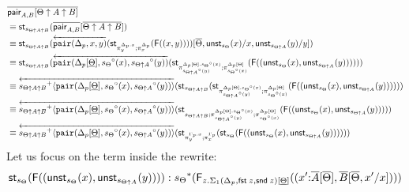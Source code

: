 \documentclass[10pt]{article}
\theoremstyle{definition}
\newcommand\dsd[1]{\ensuremath{\mathsf{#1}}}
\newcommand{\rewrite}[2]{\overleftarrow{#1}(#2)}
\newcommand\F[2]{\ensuremath{\mathsf{F}_{#1}(#2)}}
\newcommand\St[2]{\ensuremath{{#1}^*(#2)}}
\newcommand\StI[2]{\ensuremath{\mathsf{st}_{#1}(#2)}}
\newcommand\UnSt[2]{\ensuremath{\mathsf{unst}_{#1}(#2)}}
\newcommand\FI[1]{\ensuremath{\mathsf{F}{(#1)}}}
\newcommand\TrCirc[2]{\ensuremath{{#1}^\circ(#2)}}
\newcommand\ApPlus[2]{\ensuremath{{#1}^+ \langle #2 \rangle }}
\newcommand{\app}[2]{\ensuremath{#1 \: #2}}
\newcommand{\fst}[1]{\app{\dsd{fst}}{#1}}
\newcommand{\snd}[1]{\app{\dsd{snd}}{#1}}
\newcommand{\telety}[3]{\ensuremath{(#1{:}#2,#3)}}
\begin{document}
\begin{enumerate}[style = multiline, labelwidth = 80pt]
\begin{align*}
&\upstairs{\mathsf{pair}_{A, B}[\Theta \uparrow A \uparrow B]} \\
&\equiv \StI{s_{\Theta \uparrow A \uparrow B}}{\upstairs{\mathsf{pair}_{A, B}}[\upstairs{\Theta \uparrow A \uparrow B}]} \\
&\equiv \StI{s_{\Theta \uparrow A \uparrow B}}{\rewrite{\mathtt{pair}(\asdep{\Delta},x,y)}{\StI{\pi^{\asdep{\Delta}.x}_y;\pi^{\asdep{\Delta}}_x}{\FI{(x, y)}}}[\upstairs{\Theta}, \UnSt{s_{\Theta}}{x}/x, \UnSt{s_{\Theta \uparrow A}}{y}/y]} \\ 
&\equiv \StI{s_{\Theta \uparrow A \uparrow B}}{\rewrite{\mathtt{pair}(\asdep{\Delta}[\downstairs{\Theta}],\TrCirc{s_\Theta}{x},\TrCirc{s_{\Theta \uparrow A}}{y})}{\StI{\pi^{\asdep{\Delta}[\Theta].\TrCirc{s_\Theta}{x}}_{\TrCirc{s_{\Theta \uparrow A}}{y}};\pi^{\asdep{\Delta}[\Theta]}_{\TrCirc{s_\Theta}{x}}}{\FI{(\UnSt{s_{\Theta}}{x}, \UnSt{s_{\Theta \uparrow A}}{y})}}}} \\
&\equiv \rewrite{\ApPlus{s_{\Theta \uparrow A \uparrow B}}{\mathtt{pair}(\asdep{\Delta}[\downstairs{\Theta}],\TrCirc{s_\Theta}{x},\TrCirc{s_{\Theta \uparrow A}}{y})}}{\StI{s_{\Theta \uparrow A \uparrow B}}{\StI{\pi^{\asdep{\Delta}[\Theta].\TrCirc{s_\Theta}{x}}_{\TrCirc{s_{\Theta \uparrow A}}{y}};\pi^{\asdep{\Delta}[\Theta]}_{\TrCirc{s_\Theta}{x}}}{\FI{(\UnSt{s_{\Theta}}{x}, \UnSt{s_{\Theta \uparrow A}}{y})}}}} \\
&\equiv \rewrite{\ApPlus{s_{\Theta \uparrow A \uparrow B}}{\mathtt{pair}(\asdep{\Delta}[\downstairs{\Theta}],\TrCirc{s_\Theta}{x},\TrCirc{s_{\Theta \uparrow A}}{y})}}{\StI{s_{\Theta \uparrow A \uparrow B} ; \pi^{\asdep{\Delta}[\Theta].\TrCirc{s_\Theta}{x}}_{\TrCirc{s_{\Theta \uparrow A}}{y}};\pi^{\asdep{\Delta}[\Theta]}_{\TrCirc{s_\Theta}{x}}}{\FI{(\UnSt{s_{\Theta}}{x}, \UnSt{s_{\Theta \uparrow A}}{y})}}} \\
&\equiv \rewrite{\ApPlus{s_{\Theta \uparrow A \uparrow B}}{\mathtt{pair}(\asdep{\Delta}[\downstairs{\Theta}],\TrCirc{s_\Theta}{x},\TrCirc{s_{\Theta \uparrow A}}{y})}}{\StI{\pi^{\asdep{\Gamma}.x}_y;\pi^{\asdep{\Gamma}}_x}{\StI{s_{\Theta}}{\FI{(\UnSt{s_{\Theta}}{x}, \UnSt{s_{\Theta \uparrow A}}{y})}}}} \\
\end{align*}
Let us focus on the term inside the rewrite:
\begin{align*}
&\StI{s_{\Theta}}{\FI{(\UnSt{s_{\Theta}}{x}, \UnSt{s_{\Theta \uparrow A}}{y})}} : \St{s_\Theta}{\F{z.\Sigma_1(\asdep{\Delta}, \fst z, \snd z)[\downstairs{\Theta}]}{\telety{x'}{\upstairs{A}[\upstairs{\Theta}]}{\upstairs{B}[\upstairs{\Theta},x'/x]}}} \\

\end{align*}
\end{enumerate}
\end{document}
